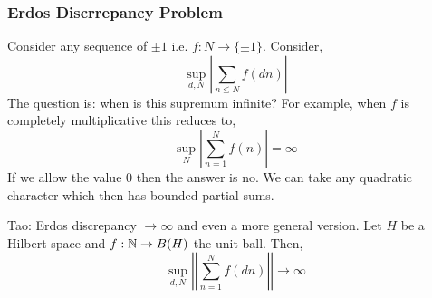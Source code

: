 \documentclass[12pt]{article}
\begin{document}
\subsubsection{Erdos Discrrepancy Problem}

Consider any sequence of $\pm 1$ i.e. $f : N \to \{ \pm 1 \}$. Consider,
\[ \sup_{d,N} \left| \sum_{n \le N} f(dn) \right| \]
The question is: when is this supremum infinite? For example, when $f$ is completely multiplicative this reduces to,
\[ \sup_N \left| \sum_{n = 1}^N f(n) \right| = \infty \]
If we allow the value $0$ then the answer is no. We can take any quadratic character which then has bounded partial sums. 

Tao: Erdos discrepancy $\to \infty$ and even a more general version. Let $H$ be a Hilbert space and $f : \mathbb{N} \to B(H)$ the unit ball. Then,
\[ \sup_{d, N} \left|\left| \sum_{n = 1}^N f(dn) \right|\right| \to \infty \]
\end{document}
